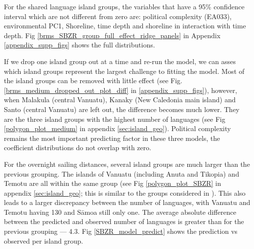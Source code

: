 \documentclass[unnumsec,webpdf,modern,medium]{oup-authoring-template}
\begin{document}
For the shared language island groups, the variables that have a 95\% confidence interval which are not different from zero are: political complexity (EA033), environmental PC1, Shoreline, time depth and shoreline in interaction with time depth. Fig \ref{brms_SBZR_group_full_effect_ridge_panels} in Appendix \ref{appendix_supp_figs} shows the full distributions.


If we drop one island group out at a time and re-run the model, we can asses which island groups represent the largest challenge to fitting the model. Most of the island groups can be removed with little effect (see Fig. \ref{brms_medium_dropped_out_plot_diff} in \ref{appendix_supp_figs}), however, when Malakula (central Vanuatu), Kanaky (New Caledonia main island) and Santo (central Vanuatu) are left out, the difference becomes much lower. They are the three island groups with the highest number of languages (see Fig \ref{polygon_plot_medium} in appendix \ref{sec:island_geo}). Political complexity remains the most important predicting factor in these three models, the coefficient distributions do not overlap with zero.


For the overnight sailing distances, several island groups are much larger than the previous grouping. The islands of Vanuatu  (including Anuta and Tikopia) and Temotu are all within the same group (see Fig \ref{polygon_plot_SBZR} in appendix \ref{sec:island_geo}; this is similar to the groups considered in \citet{pawley2007}). This also leads to a larger discrepancy between the number of languages, with Vanuatu and Temotu having 130 and S\={a}moa still only one. The average absolute difference between the predicted and observed number of languages is greater than for the previous grouping --- 4.3. Fig \ref{SBZR_model_predict} shows the prediction vs observed per island group.
\end{document}
